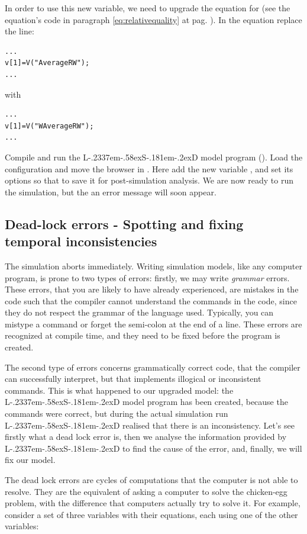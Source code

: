 \documentclass [11pt,a4paper] {book}
\def\LsD{{L\kern-.2337em\lower-.58ex\hbox{S}\kern-.181em\lower-.2ex\hbox{D}}\xspace}
\begin{document}
In order to use this new variable, we need to upgrade the equation for
 (see the equation's code in paragraph \ref{eq:relativequality} at
pag. \pageref{eq:relativequality}). In the equation replace the line:

\begin{verbatim}
...
v[1]=V("AverageRW");
...
\end{verbatim}

with

\begin{verbatim}
...
v[1]=V("WAverageRW");
...
\end{verbatim}

Compile and run the \LsD model program (). Load the configuration and move
the browser in . Here add the new variable , and set its options so that to save it for post-simulation analysis. We are now ready to run the simulation, but the an error message will soon appear.

\subsection{Dead-lock errors - Spotting and fixing temporal inconsistencies}

The simulation aborts immediately. Writing simulation models, like
any computer program, is prone to two types of errors: firstly, we may write
\emph{grammar} errors. These errors, that you are likely to have already experienced, are
mistakes in the code such that the compiler cannot understand the commands in the code, since they do not respect the grammar of the language used. Typically, you can mistype a command or forget the semi-colon at the end of a line. These errors are recognized at compile time, and they need to be fixed before the program is created.

The second type of errors concerns grammatically correct code, that the compiler can successfully interpret, but
that implements illogical or inconsistent commands. This is what happened to our upgraded
model: the \LsD model program has been created, because the commands were correct, but
during the actual simulation run \LsD realised that there is an inconsistency. Let's see
firstly what a dead lock error is, then we analyse the information provided by \LsD to
find the cause of the error, and, finally, we will fix our model.

The dead lock errors are cycles of computations that the computer is not able to resolve.
They are the equivalent of asking a computer to solve the chicken-egg problem, with the
difference that computers actually try to solve it. For example, consider a set of three
variables with their equations, each using one of the other variables:
\end{document}
